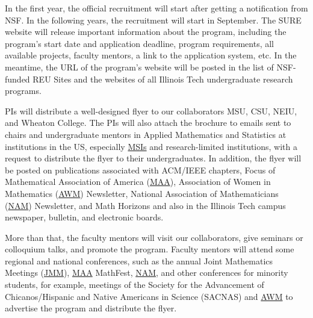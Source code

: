 \documentclass[11pt]{NSFamsart}
\newcommand{\MAA}{\hyperlink{MAAlink}{MAA}\xspace}
\newcommand{\JMM}{\hyperlink{JMMlink}{JMM}\xspace}
\newcommand{\AWM}{\hyperlink{AWMlink}{AWM}\xspace}
\newcommand{\NAM}{\hyperlink{NAMlink}{NAM}\xspace}
\newcommand{\MSIs}{\hyperlink{MSIlink}{MSIs}\xspace}
\begin{document}
 In the first year, the official recruitment will start after getting a notification from NSF.
 In the following years, the recruitment will start in September. The SURE website
 \cite{SUREWeb} will release important information about the program, including the program's start date and application deadline, program requirements,  all available projects, faculty mentors, a link to the application system, etc. In the meantime, the URL of the program’s
website \cite{SUREWeb} will be posted in the list of NSF-funded REU Sites and the websites of all Illinois Tech undergraduate research programs.

PIs will distribute a well-designed flyer to our collaborators MSU, CSU, NEIU,  and Wheaton College.
The PIs will also attach the brochure to emails sent to
chairs and undergraduate mentors in Applied Mathematics and Statistics at institutions in the US, especially
\MSIs and research-limited institutions, with a request to distribute the flyer to their undergraduates. 
In addition, the flyer
will be posted on publications associated with ACM/IEEE chapters, Focus of \hypertarget{MAAlink}{Mathematical Association of America} (\MAA), \hypertarget{AWMlink}{Association of Women in Mathematics} (\AWM)
Newsletter, \hypertarget{NAMlink}{ National Association of Mathematicians} (\NAM) Newsletter, and Math Horizons and also in the Illinois Tech campus newspaper, bulletin, and electronic boards.

More than that, the faculty mentors will visit our collaborators, give seminars or colloquium talks, and promote the program. 
Faculty mentors will attend some regional and national conferences, such as
the annual  \hypertarget{JMMlink}{Joint Mathematics Meetings} (\JMM), \MAA MathFest, \NAM, and other conferences for minority students, for example, meetings of the Society for the Advancement of Chicanos/Hispanic and Native Americans in Science  (SACNAS) and 
\AWM  to advertise the program and distribute the flyer. 
\end{document}
